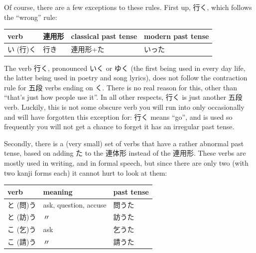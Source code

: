 \documentclass[11pt, b5paper, twoside, openright, onecolumn]{book}
\makeatletter
\newcommand*{\rtrubystack}[2]{{\relscale{0.5}%
  \begin{tabular}[b]{@{}c@{}}%
    {#1}\\%
    {\textscale{2}{#2}}%
  \end{tabular}}%
}
\DeclareRobustCommand*{\rtruby}[2]{%
  \mbox{%
    \setlength{\parskip}{0ex}%
    \BeginAccSupp{method=pdfstringdef,ActualText={#1}}%
      \rtrubystack{\phantom{#2}}{#1}%
      \llap{%
        \rtrubystack{#2}{\phantom{#1}}%
      }%
    \EndAccSupp{}%
  }%
}
\renewcommand*{\rtruby}[2]{#2 (#1)}%
\newenvironment{mytabular}[1]{\noindent\hspace{0.4in}
\begin{tabular}[h]{#1}}{\end{tabular}}
\newenvironment{mytabularcentered}[1]{\noindent
\begin{center}\begin{tabular}[h]{#1}}{\end{tabular}\end{center}}
\makeatother
\begin{document}
Of course‚ there are a few exceptions to these rules. First up‚ 行く‚ which follows the “wrong” rule:

\vspace{0.5cm}
\smaller
\begin{center}
\begin{mytabularcentered}{| l  l  l  l |}\hline 
\rule{0pt}{2.4ex}verb & 連用形 & classical past tense & modern past tense\\ 
\hline
\rule{0pt}{3.6ex}\index[japanese]{いく (行く)}\rtruby{行}{い}く & 行き & 連用形+た & \index[japanese]{いった}いった\\ 
\hline 
\end{mytabularcentered}
\end{center}
\larger
\vspace{0.5cm}


The verb 行く‚ pronounced いく or ゆく (the first being used in every day life‚ the latter being used in poetry and song lyrics)‚ does not follow the contraction rule for 五段 verbs ending on く. There is no real reason for this‚ other than “that’s just how people use it”. In all other respects‚ 行く is just another 五段 verb. Luckily‚ this is not some obscure verb you will run into only occasionally and will have forgotten this exception for: 行く means “go”‚ and is used so frequently you will not get a chance to forget it has an irregular past tense.

Secondly‚ there is a (very small) set of verbs that have a rather abnormal past tense‚ based on adding た to the 連体形 instead of the 連用形. These verbs are mostly used in writing‚ and in formal speech‚ but since there are only two (with two kanji forms each) it cannot hurt to look at them:

\vspace{0.5cm}
\smaller
\begin{mytabular}{| l  l  l |}\hline 
\rule{0pt}{2.4ex}verb & meaning & past tense\\ 
\hline
\rule{0pt}{3.6ex}\rtruby{問}{と}う & ask‚ question‚ accuse & 問うた\\ 
\rule{0pt}{3.6ex}\rtruby{訪}{と}う & 〃 & 訪うた\\ 
\rule{0pt}{3.6ex}\rtruby{乞}{こ}う & ask & 乞うた\\ 
\rule{0pt}{3.6ex}\rtruby{請}{こ}う & 〃 & 請うた\\ 
\hline 
\end{mytabular}
\larger
\vspace{0.5cm}
\end{document}
